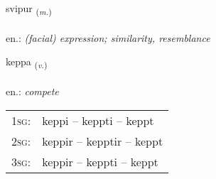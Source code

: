 \documentclass[frontgrid, backgrid]{flacards}\usepackage[]{graphicx}\usepackage[]{xcolor}
\begin{document}
\renewcommand{\flhead}{\vskip5pt \fboxsep=0pt {\small\bfseries\footnotesize Nafnorð | Noun}}
\renewcommand{\fcfoot}{\vskip5pt \fboxsep=0pt \hspace{2pt}{\small\bfseries\footnotesize 2K}}

\renewcommand{\blhead}{\vskip5pt {\small\bfseries\footnotesize Nafnorð | Noun }}
\renewcommand{\bcfoot}{\vskip5pt \hspace{2pt}{\small\bfseries\footnotesize 2K}}


{svipur \small{\textsubscript{(\textit{m.})}} \\[1ex] %
\textphonetic{[svɪːpʏr]} \\
en.: \emph{(facial) expression; similarity, resemblance} \\  [2ex]
\renewcommand*{\arraystretch}{0.8}
}

\renewcommand{\flhead}{\vskip5pt \fboxsep=0pt {\small\bfseries\footnotesize Sagnorð | Verb}}
\renewcommand{\fcfoot}{\vskip5pt \fboxsep=0pt \hspace{2pt}{\small\bfseries\footnotesize 2K}}

\renewcommand{\blhead}{\vskip5pt {\small\bfseries\footnotesize Sagnorð | Verb }}
\renewcommand{\bcfoot}{\vskip5pt \hspace{2pt}{\small\bfseries\footnotesize 2K}}


{keppa \small{\textsubscript{(\textit{v.})}} \\[1ex] %
\textphonetic{[cʰɛhpa]} \\
en.: \emph{compete} \\  [2ex]
\renewcommand*{\arraystretch}{0.8}
\begin{tabular}{p{1cm}l}
\textsc{1sg}: & keppi -- keppti -- keppt \\ 
\textsc{2sg}: & keppir -- kepptir -- keppt \\ 
\textsc{3sg}: & keppir -- keppti -- keppt \\ 
\end{tabular}
}
\end{document}
